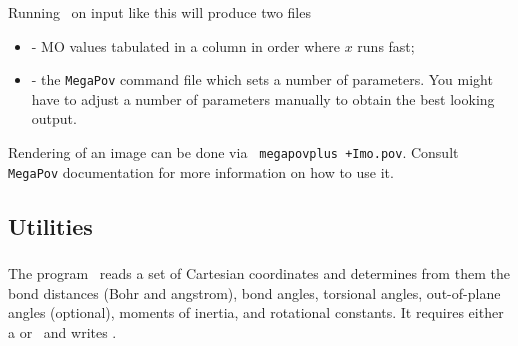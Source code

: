 Running \PSIoeprop\ on input like this will produce two files
\begin{itemize} \item {} - MO values tabulated in a column
in order where $x$ runs fast; \item {} - the {\tt MegaPov}
command file which sets a number of parameters. You might have to
adjust a number of parameters manually to obtain the best looking
output.  \end{itemize} Rendering of an image can be done via {\tt
megapovplus +Imo.pov}.  Consult {\tt MegaPov} documentation for more
information on how to use it.

\subsection{Utilities}
\subsubsection{\PSIgeom}
The program \PSIgeom\ reads a set of Cartesian coordinates and
determines from them the bond distances (Bohr and angstrom), bond
angles, torsional angles, out-of-plane angles (optional), moments of
inertia, and rotational constants.  It requires either a 
or \geomdat\ and writes \geomout.


